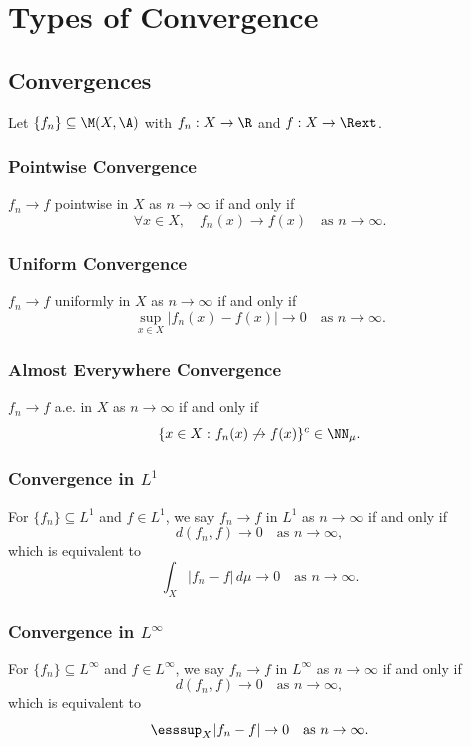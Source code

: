 \section{Types of Convergence}

\subsection{Convergences}
Let $\{f_n\} \subseteq \M(X,\A)$ with $f_n : X \to \R$ and $f : X \to \Rext$.

\subsubsection{Pointwise Convergence}
$f_n \to f$ pointwise in $X$ as $n \to \infty$ if and only if
\[
\forall x \in X, \quad f_n(x) \to f(x) \quad \text{as } n \to \infty.
\]

\subsubsection{Uniform Convergence}
$f_n \to f$ uniformly in $X$ as $n \to \infty$ if and only if
\[
\sup_{x \in X} |f_n(x) - f(x)| \to 0 \quad \text{as } n \to \infty.
\]

\subsubsection{Almost Everywhere Convergence}
$f_n \to f$ a.e. in $X$ as $n \to \infty$ if and only if
\[
\{x \in X : f_n(x) \not\to f(x)\}^c \in \NN_\mu.
\]

\subsubsection{Convergence in $L^1$}
For $\{f_n\} \subseteq L^1$ and $f \in L^1$, we say $f_n \to f$ in $L^1$ as $n \to \infty$ if and only if
\[
d(f_n, f) \to 0 \quad \text{as } n \to \infty,
\]
which is equivalent to
\[
\int_X |f_n - f| \, d\mu \to 0 \quad \text{as } n \to \infty.
\]

\subsubsection{Convergence in $L^\infty$}
For $\{f_n\} \subseteq L^\infty$ and $f \in L^\infty$, we say $f_n \to f$ in $L^\infty$ as $n \to \infty$ if and only if
\[
d(f_n, f) \to 0 \quad \text{as } n \to \infty,
\]
which is equivalent to
\[
\esssup_X |f_n - f| \to 0 \quad \text{as } n \to \infty.
\]

